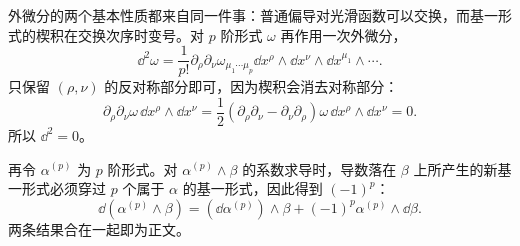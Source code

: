 
\begin{derivation}
外微分的两个基本性质都来自同一件事：普通偏导对光滑函数可以交换，而基一形式的楔积在交换次序时变号。对 $p$ 阶形式 $\omega$ 再作用一次外微分，
\begin{equation*}
 \dd^2 \omega
 =\frac1{p!}\partial_\rho\partial_\nu\omega_{\mu_1\cdots\mu_p}
 \dd x^\rho\wedge\dd x^\nu\wedge
 \dd x^{\mu_1}\wedge\cdots .
\end{equation*}
只保留 $(\rho,\nu)$ 的反对称部分即可，因为楔积会消去对称部分：
\begin{equation*}
 \partial_\rho\partial_\nu\omega\,
 \dd x^\rho\wedge\dd x^\nu
 =\frac12(\partial_\rho\partial_\nu-\partial_\nu\partial_\rho)\omega\,
 \dd x^\rho\wedge\dd x^\nu=0.
\end{equation*}
所以 $\dd^2=0$。

再令 $\alpha^{(p)}$ 为 $p$ 阶形式。对 $\alpha^{(p)}\wedge\beta$ 的系数求导时，导数落在 $\beta$ 上所产生的新基一形式必须穿过 $p$ 个属于 $\alpha$ 的基一形式，因此得到 $(-1)^p$：
\begin{equation*}
 \dd(\alpha^{(p)}\wedge\beta)
 =(\dd\alpha^{(p)})\wedge\beta
 +(-1)^p\alpha^{(p)}\wedge\dd\beta.
\end{equation*}
两条结果合在一起即为正文。
\end{derivation}

